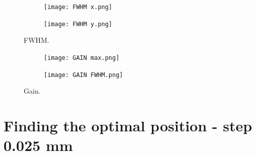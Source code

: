 \documentclass{article}
\begin{document}
\begin{figure}[h!]
\begin{center}
    \begin{subfigure}[b]{0.4\textwidth}
	\centering
      \texttt{[image: FWHM x.png]}
      \label{fig:02x}
    \end{subfigure}
    \begin{subfigure}[b]{0.4\textwidth}
	\centering
      \texttt{[image: FWHM y.png]}
      \label{fig:02y}
    \end{subfigure}
  	\caption{FWHM.}
    \begin{subfigure}[b]{0.4\textwidth}
	\centering
      \texttt{[image: GAIN max.png]}
      \label{fig:03max}
    \end{subfigure}
    \begin{subfigure}[b]{0.4\textwidth}
	\centering
      \texttt{[image: GAIN FWHM.png]}
      \label{fig:03}
    \end{subfigure}
  	\caption{Gain.}
\end{center}
\end{figure}

\clearpage
\newpage

\section{Finding the optimal position - step 0.025 mm}
\end{document}
